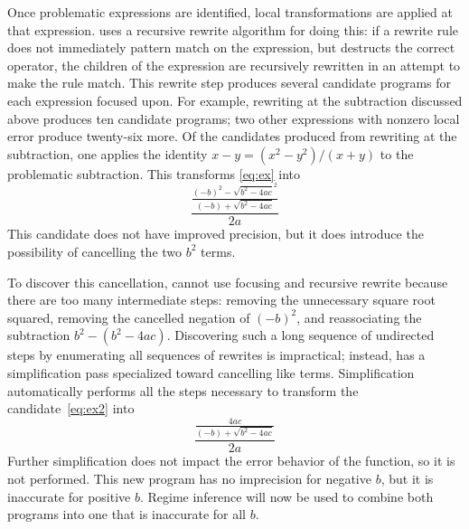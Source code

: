 \documentclass[paper.tex]{subfiles}
\begin{document}
Once problematic expressions are identified, local transformations are
applied at that expression.  \casio uses a recursive rewrite algorithm
for doing this: if a rewrite rule does not immediately pattern match
on the expression, but destructs the correct operator, the children of
the expression are recursively rewritten in an attempt to make the
rule match.  This rewrite step produces several candidate programs for
each expression focused upon.  For example, rewriting at the
subtraction discussed above produces ten candidate programs; two other
expressions with nonzero local error produce twenty-six more.  Of the
candidates produced from rewriting at the subtraction, one applies the
identity $x - y = (x^2 - y^2) / (x + y)$ to the problematic
subtraction.  This transforms \eqref{eq:ex} into
\begin{equation} \label{eq:ex2}
  \frac{\frac{(-b)^2 - \sqrt{b^2 - 4ac}^2}
             {(-b) + \sqrt{b^2 - 4ac}}}
       {2a}
\end{equation}
This candidate does not have improved precision, but it does introduce
the possibility of cancelling the two $b^2$ terms.

To discover this cancellation, \casio cannot use focusing and
recursive rewrite because there are too many intermediate steps:
removing the unnecessary square root squared, removing the cancelled
negation of $(-b)^2$, and reassociating the subtraction $b^2 - (b^2 - 4ac)$.
Discovering such a long sequence of undirected steps by
enumerating all sequences of rewrites is impractical; instead, \casio
has a simplification pass specialized toward cancelling like terms.
Simplification automatically performs all the steps necessary to
transform the candidate~\eqref{eq:ex2} into
\begin{equation} \label{eq:ex3}
  \frac{\frac{4ac} {(-b) + \sqrt{b^2 - 4ac}}} {2a}
\end{equation}
Further simplification does not impact the error behavior of the
function, so it is not performed.  This new program has no imprecision
for negative $b$, but it is inaccurate for positive $b$.  Regime
inference will now be used to combine both programs into one that is
inaccurate for all $b$.
\end{document}
